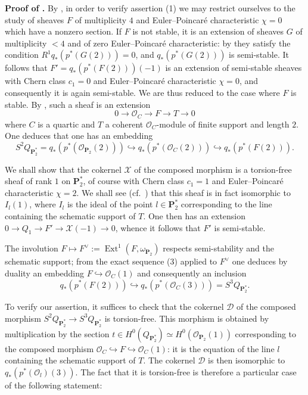 \documentclass[12pt,english]{smfart}%
\theoremstyle{plain}
\theoremstyle{definition}
\theoremstyle{remark}
\newcommand{\PP}{\mathbf{P}}
\newcommand{\Pd}{\PP_{2}^{*}}          %
\newcommand{\Oo}{\mathcal{O}}
\DeclareMathOperator{\Ext}{Ext}
\newcommand{\origpage}[1]{\marginnote{\scriptsize\itshape p.~#1}}
\begin{document}
\medskip
\noindent\textbf{Proof of .} By , in order to verify assertion (1) we may restrict ourselves to the study of sheaves $F$ of multiplicity $4$ and Euler--Poincar\'e characteristic $\chi=0$ which have a nonzero section. If $F$ is not stable, it is an extension of sheaves $G$ of multiplicity $<4$ and of zero Euler--Poincar\'e characteristic: by  they satisfy the condition $R^1q_*(p^*(G(2)))=0$, and $q_*(p^*(G(2)))$ is semi-stable. It follows that $F' = q_*(p^*(F(2)))(-1)$ is an extension of semi-stable sheaves with Chern class $c_1=0$ and Euler--Poincar\'e characteristic $\chi=0$, and consequently it is again semi-stable. We are thus reduced to the case where $F$ is stable. By , such a sheaf is an extension
\begin{equation}
0 \longrightarrow \Oo_C \longrightarrow F \longrightarrow T \longrightarrow 0
\end{equation}
where $C$ is a quartic and $T$ a coherent $\Oo_C$-module of finite support and length $2$. One deduces that one has an embedding
\[
S^2Q_{\Pd} = q_*(p^*(\Oo_{\PP_2}(2)))\hookrightarrow q_*(p^*(\Oo_C(2)))
\hookrightarrow q_*(p^*(F(2))).
\]

\origpage{663}%
We shall show that the cokernel $\mathscr{X}$ of the composed morphism is a torsion-free sheaf of rank $1$ on $\Pd$, of course with Chern class $c_1=1$ and Euler--Poincar\'e characteristic $\chi=2$. We shall see (cf.\ ) that this sheaf is in fact isomorphic to $I_l(1)$, where $I_l$ is the ideal of the point $l\in\Pd$ corresponding to the line containing the schematic support of $T$. One then has an extension $0\to Q_1\to F'\to \mathscr{X}(-1)\to 0$, whence it follows that $F'$ is semi-stable.

The involution $F\mapsto F^{\vee}:=\Ext^1(F,\omega_{\PP_2})$ respects semi-stability and the schematic support; from the exact sequence (3) applied to $F^{\vee}$ one deduces by duality an embedding $F\hookrightarrow \Oo_C(1)$ and consequently an inclusion
\[
q_*(p^*(F(2)))\hookrightarrow q_*(p^*(\Oo_C(3))) = S^3Q_{\Pd}.
\]

To verify our assertion, it suffices to check that the cokernel $\mathcal{D}$ of the composed morphism $S^2Q_{\Pd}\to S^3Q_{\Pd}$ is torsion-free. This morphism is obtained by multiplication by the section $t\in H^0(Q_{\Pd})\simeq H^0(\Oo_{\PP_2}(1))$ corresponding to the composed morphism $\Oo_C\hookrightarrow F\hookrightarrow \Oo_C(1)$: it is the equation of the line $l$ containing the schematic support of $T$. The cokernel $\mathcal{D}$ is then isomorphic to $q_*(p^*(\Oo_l)(3))$. The fact that it is torsion-free is therefore a particular case of the following statement:
\end{document}
